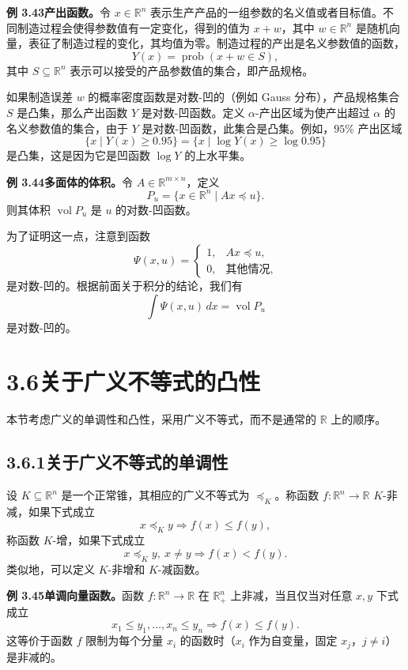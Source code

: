 \documentclass[UTF8, 12pt, fontset=fandol, oneside]{ctexart}
\begin{document}
\noindent\textbf{例 3.43\quad 产出函数。}\quad 令 $x\in\mathbb{R}^n$ 表示生产产品的一组参数的名义值或者目标值。不同制造过程会使得参数值有一定变化，得到的值为 $x+w$，其中 $w\in\mathbb{R}^n$ 是随机向量，表征了制造过程的变化，其均值为零。制造过程的产出是名义参数值的函数，
\[
Y(x)=\operatorname{prob}(x+w\in S),
\]
其中 $S\subseteq\mathbb{R}^n$ 表示可以接受的产品参数值的集合，即产品规格。

如果制造误差 $w$ 的概率密度函数是对数-凹的（例如 Gauss 分布），产品规格集合 $S$ 是凸集，那么产出函数 $Y$ 是对数-凹函数。定义 $\alpha$-产出区域为使产出超过 $\alpha$ 的名义参数值的集合，由于 $Y$ 是对数-凹函数，此集合是凸集。例如，$95\%$ 产出区域
\[
\{x\mid Y(x)\geq0.95\}=\{x\mid \log Y(x)\geq \log0.95\}
\]
是凸集，这是因为它是凹函数 $\log Y$ 的上水平集。

\noindent\textbf{例 3.44\quad 多面体的体积。}\quad 令 $A\in\mathbb{R}^{m\times n}$，定义
\[
P_u=\{x\in\mathbb{R}^n\mid Ax\preceq u\}.
\]
则其体积 $\operatorname{vol}P_u$ 是 $u$ 的对数-凹函数。

为了证明这一点，注意到函数
\[
\Psi(x,u)=
\begin{cases}
1, & Ax\preceq u,\\
0, & \text{其他情况},
\end{cases}
\]
是对数-凹的。根据前面关于积分的结论，我们有
\[
\int\Psi(x,u)\,dx=\operatorname{vol}P_u
\]
是对数-凹的。

\section*{3.6\quad 关于广义不等式的凸性}

本节考虑广义的单调性和凸性，采用广义不等式，而不是通常的 $\mathbb{R}$ 上的顺序。

\subsection*{3.6.1\quad 关于广义不等式的单调性}

设 $K\subseteq\mathbb{R}^n$ 是一个正常锥，其相应的广义不等式为 $\preceq_K$。称函数 $f:\mathbb{R}^n\to\mathbb{R}$ $K$-非减，如果下式成立
\[
x\preceq_K y\Longrightarrow f(x)\leq f(y),
\]
称函数 $K$-增，如果下式成立
\[
x\preceq_K y,\ x\neq y\Longrightarrow f(x)<f(y).
\]
类似地，可以定义 $K$-非增和 $K$-减函数。

\noindent\textbf{例 3.45\quad 单调向量函数。}\quad 函数 $f:\mathbb{R}^n\to\mathbb{R}$ 在 $\mathbb{R}_+^n$ 上非减，当且仅当对任意 $x,y$ 下式成立
\[
x_1\leq y_1,\ldots,x_n\leq y_n\Longrightarrow f(x)\leq f(y).
\]
这等价于函数 $f$ 限制为每个分量 $x_i$ 的函数时（$x_i$ 作为自变量，固定 $x_j$，$j\neq i$）是非减的。
\end{document}
